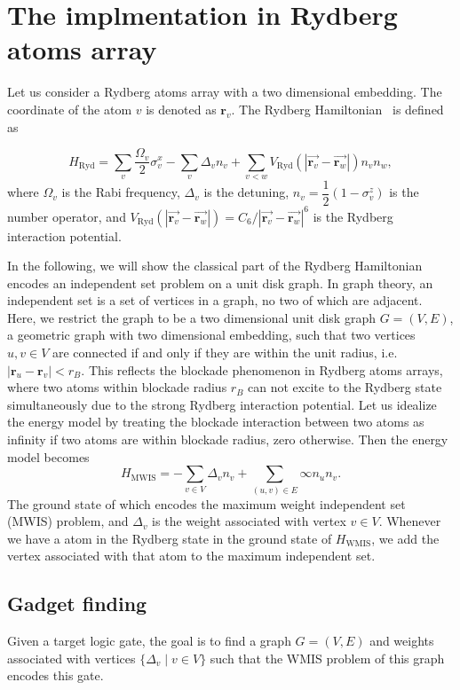 \documentclass[twocolumn,superscriptaddress,english,showpacs,longbibliography]{revtex4-2}
\begin{document}
\section{The implmentation in Rydberg atoms array}\label{physical-model-rydberg-atoms-array}
Let us consider a Rydberg atoms array with a two dimensional embedding. The coordinate of the atom $v$ is denoted as $\mathbf{r}_v$.
The Rydberg Hamiltonian~\cite{Nguyen2023} is defined as

\begin{equation}
    H_{\text{Ryd}} = \sum_v \dfrac{\Omega_v}{2} \sigma^x_v -\sum_v \Delta_v n_v + \sum_{v < w}  V_{\text{Ryd}}(|\overrightarrow{\mathbf{r}_v} -\overrightarrow{\mathbf{r}_w}|)n_v n_w,
\end{equation}
where $\Omega_v$ is the Rabi frequency, $\Delta_v$ is the detuning,
$n_v = \dfrac{1}{2}(1 - \sigma^z_v)$ is the number operator, and
$V_{\text{Ryd}}(|\overrightarrow{\mathbf{r}_v} - \overrightarrow{\mathbf{r}_w}|) = C_6/|\overrightarrow{\mathbf{r}_v} - \overrightarrow{\mathbf{r}_w}|^6$
is the Rydberg interaction potential.

In the following, we will show the classical part of the Rydberg Hamiltonian encodes an independent set problem on a unit disk graph.
In graph theory, an independent set is a set of vertices in a graph, no two of which are adjacent.
Here, we restrict the graph to be a two dimensional unit disk graph $G=(V, E)$, a geometric graph with two dimensional embedding, such that two vertices $u, v \in V$ are connected if and only if they are within the unit radius, i.e. $|\mathbf r_u - \mathbf r_v| < r_B$. This reflects the blockade phenomenon in Rydberg atoms arrays, where two atoms within blockade radius $r_B$ can not excite to the Rydberg state simultaneously due to the strong Rydberg interaction potential. Let us idealize the energy model by treating the blockade interaction between two atoms as infinity if two atoms are within blockade radius, zero otherwise. Then the energy model becomes
\begin{equation}
H_{\text{MWIS}} = -\sum_{v \in V}\Delta_v n_v + \sum_{(u, v) \in E} \infty n_u n_v.
\end{equation}
The ground state of which encodes the maximum weight independent set (MWIS) problem, and $\Delta_v$ is the weight associated with vertex $v \in V$. Whenever we have a atom in the Rydberg state in the ground state of $H_{\text{WMIS}}$, we add the vertex associated with that atom to the maximum independent set.

\subsection{Gadget finding}
Given a target logic gate, the goal is to find a graph $G = (V, E)$ and weights associated with vertices $\{\Delta_v \mid v\in V\}$ such that the WMIS problem of this graph encodes this gate.
\end{document}
